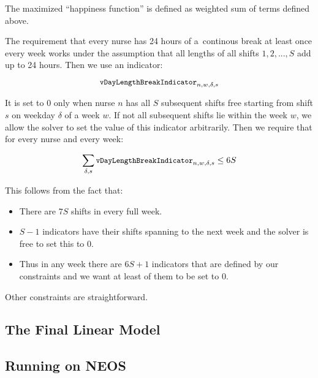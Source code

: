 The maximized ``happiness function'' is defined as weighted sum of terms defined above.

The requirement that every nurse has 24 hours of a~continous break at least once every week works under the assumption that all lengths of all shifts $1, 2, ..., S$ add up to 24 hours. Then we use an indicator:

\[ \texttt{\small vDayLengthBreakIndicator}_{n, w, \delta, s} \]

It is set to $0$ only when nurse $n$ has all $S$ subsequent shifts free starting from shift $s$ on weekday $\delta$ of a week $w$. If not all subsequent shifts lie within the week $w$, we allow the solver to set the value of this indicator arbitrarily. Then we require that for every nurse and every week:

\[ \sum_{\delta, s} \texttt{\small vDayLengthBreakIndicator}_{n, w, \delta, s} \le 6S \]

This follows from the fact that:
\begin{itemize}
    \item There are $7S$ shifts in every full week.
    \item $S - 1$ indicators have their shifts spanning to the next week and the solver is free to set this to 0.
    \item Thus in any week there are $6S + 1$ indicators that are defined by our constraints and we want at least of them to be set to $0$.
\end{itemize}

Other constraints are straightforward.

\subsection{The Final Linear Model}


\subsection{Running on NEOS}
